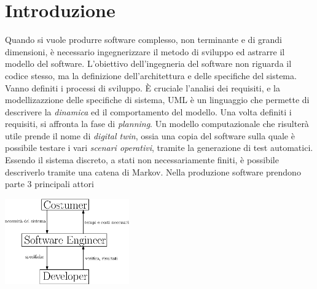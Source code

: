 \documentclass[10pt, letterpaper]{report}
\begin{document}
\chapter{Introduzione}
Quando si vuole produrre software complesso, non terminante e di grandi dimensioni, è 
necessario ingegnerizzare il metodo di sviluppo ed astrarre il modello del software. 
L'obiettivo dell'ingegneria del software non riguarda il codice stesso, ma la definizione 
dell'architettura e delle specifiche del sistema. Vanno definiti i processi di sviluppo.\acc 
È cruciale l'analisi dei requisiti, e la modellizazzione delle specifiche di sistema, UML è un 
linguaggio che permette di descrivere la \textit{dinamica} ed il comportamento del modello. Una volta 
definiti i requisiti, si affronta la fase di \textit{planning}.\acc 
Un modello computazionale che risulterà utile prende il nome di \textit{digital twin}, ossia 
una copia del software sulla quale è possibile testare i vari \textit{scenari operativi}, tramite la 
generazione di test automatici. Essendo il sistema discreto, a stati non necessariamente 
finiti, è possibile descriverlo tramite una catena di Markov. \acc 
Nella produzione software prendono parte 3 principali attori\begin{center}
    \includegraphics[width=0.4\textwidth ]{images/attori.eps}
\end{center}
\end{document}
